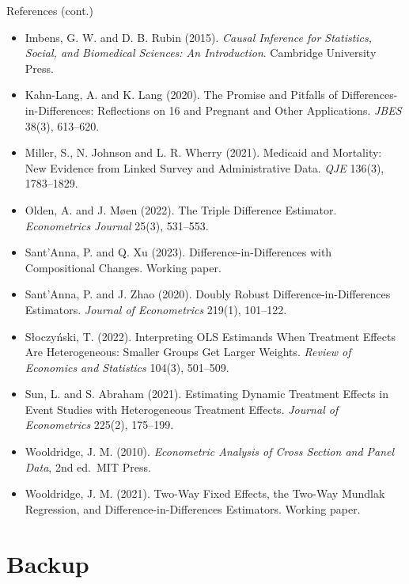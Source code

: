 \documentclass[
  11pt,
  ignorenonframetext,
  aspectratio=169,
]{beamer}
\providecommand{\tightlist}{%
  \setlength{\itemsep}{0pt}\setlength{\parskip}{0pt}}
\begin{document}
\begin{frame}{References (cont.)}
\protect{}\label{references-cont.}
\tiny

\begin{itemize}
\tightlist
\item
  Imbens, G. W. and D. B. Rubin (2015). \emph{Causal Inference for
  Statistics, Social, and Biomedical Sciences: An Introduction}.
  Cambridge University Press.
\item
  Kahn-Lang, A. and K. Lang (2020). The Promise and Pitfalls of
  Differences-in-Differences: Reflections on 16 and Pregnant and Other
  Applications. \emph{JBES} 38(3), 613--620.
\item
  Miller, S., N. Johnson and L. R. Wherry (2021). Medicaid and
  Mortality: New Evidence from Linked Survey and Administrative Data.
  \emph{QJE} 136(3), 1783--1829.
\item
  Olden, A. and J. Møen (2022). The Triple Difference Estimator.
  \emph{Econometrics Journal} 25(3), 531--553.
\item
  Sant'Anna, P. and Q. Xu (2023). Difference-in-Differences with
  Compositional Changes. Working paper.
\item
  Sant'Anna, P. and J. Zhao (2020). Doubly Robust
  Difference-in-Differences Estimators. \emph{Journal of Econometrics}
  219(1), 101--122.
\item
  Słoczyński, T. (2022). Interpreting OLS Estimands When Treatment
  Effects Are Heterogeneous: Smaller Groups Get Larger Weights.
  \emph{Review of Economics and Statistics} 104(3), 501--509.
\item
  Sun, L. and S. Abraham (2021). Estimating Dynamic Treatment Effects in
  Event Studies with Heterogeneous Treatment Effects. \emph{Journal of
  Econometrics} 225(2), 175--199.
\item
  Wooldridge, J. M. (2010). \emph{Econometric Analysis of Cross Section
  and Panel Data}, 2nd ed.~MIT Press.
\item
  Wooldridge, J. M. (2021). Two-Way Fixed Effects, the Two-Way Mundlak
  Regression, and Difference-in-Differences Estimators. Working paper.
\end{itemize}
\end{frame}

\section{Backup}\label{backup}
\end{document}

